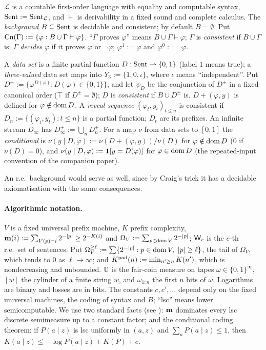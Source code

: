 \begin{definition}\label{def:setting:data}
$\mathcal L$ is a countable first-order language with equality and computable syntax, $\mathrm{Sent}:=\mathrm{Sent}_{\mathcal L}$, and $\vdash$ is derivability in a fixed sound and complete calculus. The \emph{background} $B\subseteq\mathrm{Sent}$ is decidable and consistent; by default $B=\emptyset$. Put $\mathrm{Cn}(\Gamma):=\{\varphi:B\cup\Gamma\vdash\varphi\}$. ``$\Gamma$ proves $\varphi$'' means $B\cup\Gamma\vdash\varphi$; $\Gamma$ is \emph{consistent} if $B\cup\Gamma$ is; $\Gamma$ \emph{decides} $\varphi$ if it proves $\varphi$ or $\neg\varphi$; $\varphi^1:=\varphi$ and $\varphi^0:=\neg\varphi$.

A \emph{data set} is a finite partial function $D:\mathrm{Sent}\rightharpoonup\{0,1\}$ (label $1$ means true); a \emph{three-valued} data set maps into $Y_3:=\{1,0,\iota\}$, where $\iota$ means ``independent''. Put $D^\pm:=\{\varphi^{D(\varphi)}:D(\varphi)\in\{0,1\}\}$, and let $\psi_D$ be the conjunction of $D^\pm$ in a fixed canonical order ($\top$ if $D^\pm=\emptyset$); $D$ is \emph{consistent} if $B\cup D^\pm$ is. $D+(\varphi,y)$ is defined for $\varphi\notin\operatorname{dom} D$. A \emph{reveal sequence} $(\varphi_t,y_t)_{t\le n}$ is consistent if $D_n:=\{(\varphi_t,y_t):t\le n\}$ is a partial function; $D_t$ are its prefixes. An infinite stream $D_\infty$ has $D_\infty^\pm:=\bigcup_nD_n^\pm$. For a map $\nu$ from data sets to $[0,1]$ the \emph{conditional} is $\nu(y\mid D,\varphi):=\nu(D+(\varphi,y))/\nu(D)$ for $\varphi\notin\operatorname{dom} D$ ($0$ if $\nu(D)=0$), and $\nu(y\mid D,\varphi):=\mathbf{1}[y=D(\varphi)]$ for $\varphi\in\operatorname{dom} D$ (the repeated-input convention of the companion paper).
\end{definition}

An r.e.\ background would serve as well, since by Craig's trick it has a decidable axiomatisation with the same consequences.

\paragraph{Algorithmic notation.} $V$ is a fixed universal prefix machine, $K$ prefix complexity, $\mathbf{m}(i):=\sum_{V(p)=i}2^{-\lvert p\rvert}\ge2^{-K(i)}$ and $\Omega_V:=\sum_{p\in\operatorname{dom} V}2^{-\lvert p\rvert}$; $\mathsf{W}_{e}$ is the $e$-th r.e.\ set of sentences. Put $\Omega_{V}^{\ge \ell}:=\sum\{2^{-\lvert p\rvert}:p\in\operatorname{dom} V,\ \lvert p\rvert\ge\ell\}$, the tail of $\Omega_V$, which tends to $0$ as $\ell\to\infty$; and $K^{\mathrm{pad}}(n):=\min_{n'\ge n}K(n')$, which is nondecreasing and unbounded. $\mathbb{U}$ is the fair-coin measure on tapes $\omega\in\{0,1\}^\infty$, $[w]$ the cylinder of a finite string $w$, and $\omega_{1:n}$ the first $n$ bits of $\omega$. Logarithms are binary and losses are in bits. The constants $c,c',\dots$ depend only on the fixed universal machines, the coding of syntax and $B$; ``lsc'' means lower semicomputable. We use two standard facts (see \citealp{li2008introduction}): $\mathbf{m}$ dominates every lsc discrete semimeasure up to a constant factor; and the conditional coding theorem: if $P(a\mid z)$ is lsc uniformly in $(a,z)$ and $\sum_aP(a\mid z)\le1$, then $K(a\mid z)\le-\log P(a\mid z)+K(P)+c$.

